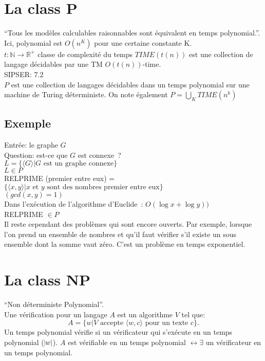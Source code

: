 \documentclass[a4paper,12pt]{article}
\begin{document}
\section{La class P}
  ``Tous les modèles calculables raisonnables sont équivalent en temps polynomial.''.  Ici, polynomial est $O(n^K)$ pour une certaine constante K.\\
  $t: \mathbb{N} \rightarrow \mathbb{R}^+$ classe de complexité du temps $TIME(t(n))$ est une collection de langage décidables par une TM $O(t(n))$-time.\\
  SIPSER: 7.2\\

  $P$ est une collection de langages décidables dans un temps polynomial sur une machine de Turing déterministe. On note également $P = \bigcup_K TIME(n^k)$

  \subsection{Exemple}
    Entrée: le graphe $G$\\
    Question: est-ce que $G$ est connexe~?\\
    $L = \{\langle G\rangle | G \text{ est un graphe connexe}\}$\\
    $L \in P$\\

  RELPRIME (premier entre eux) = $\{\langle x, y\rangle | x \text{ et } y \text{ sont des nombres premier entre eux}\}$\\
  $(gcd(x, y) = 1)$\\
  Dans l'exécution de l'algorithme d'Euclide~: $O(\log x + \log y))$\\
  RELPRIME $\in P$\\

  Il reste cependant des problèmes qui sont encore ouverts. Par exemple, lorsque l'on prend un ensemble de nombres et qu'il faut vérifier s'il existe un sous ensemble dont la somme vaut zéro. C'est un problème en temps exponentiel.  %

\section{La class NP}
  ``Non déterministe Polynomial''.\\
  Une vérification pour un langage $A$ est un algorithme $V$ tel que:
	\[A = \{w | V \text{ accepte } \langle w, c\rangle \text{ pour un texte } c\}.\]
  Un temps polynomial vérifie si un vérificateur qui s'exécute en un temps polynomial ($\abs w$).
	$A$ est vérifiable en un temps polynomial $\leftrightarrow \exists $ un vérificateur en un temps polynomial.
\end{document}
